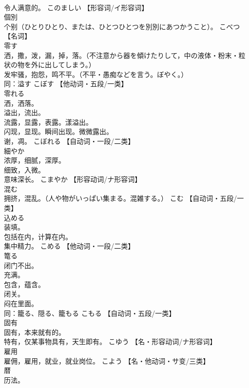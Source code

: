 \documentclass[8pt]{extreport}
\begin{document}
\begin{CJK}{UTF8}{min}
\\	令人满意的。	このましい		【形容词/イ形容词】
\\	個別	
\\	个别（ひとりひとり、または、ひとつひとつを別別にあつかうこと）。	こべつ		【名词】
\\	零す	
\\	洒，撒，泼，漏，掉，落。（不注意から器を傾けたりして，中の液体・粉末・粒状の物を外に出してしまう。） 
\\	发牢骚，抱怨，鸣不平。（不平・愚痴などを言う。ぼやく。） 
\\	同：溢す	こぼす		【他动词・五段/一类】
\\	零れる	
\\	洒，洒落。 
\\	溢出，流出。 
\\	流露，显露，表露。漾溢出。 
\\	闪现，显现。瞬间出现。微微露出。 
\\	谢，凋。	こぼれる		【自动词・一段/二类】
\\	細やか	
\\	浓厚，细腻，深厚。 
\\	细致，入微。 
\\	意味深长。	こまやか		【形容动词/ナ形容词】
\\	混む	
\\	拥挤，混乱。（人や物がいっぱい集まる。混雑する。）	こむ		【自动词・五段/一类】
\\	込める	
\\	装填。 
\\	包括在内，计算在内。 
\\	集中精力。	こめる		【他动词・一段/二类】
\\	篭る	
\\	闭门不出。 
\\	充满。 
\\	包含，蕴含。 
\\	闭关。 
\\	闷在里面。 
\\	同：籠る、隠る、籠もる	こもる		【自动词・五段/一类】
\\	固有	
\\	固有，本来就有的。 
\\	特有，仅某事物具有，天生即有。	こゆう		【名・形容动词/ナ形容词】
\\	雇用	
\\	雇佣，雇用，就业，就业岗位。	こよう		【名・他动词・サ变/三类】
\\	暦	
\\	历法。 

\end{CJK}
\end{document}
